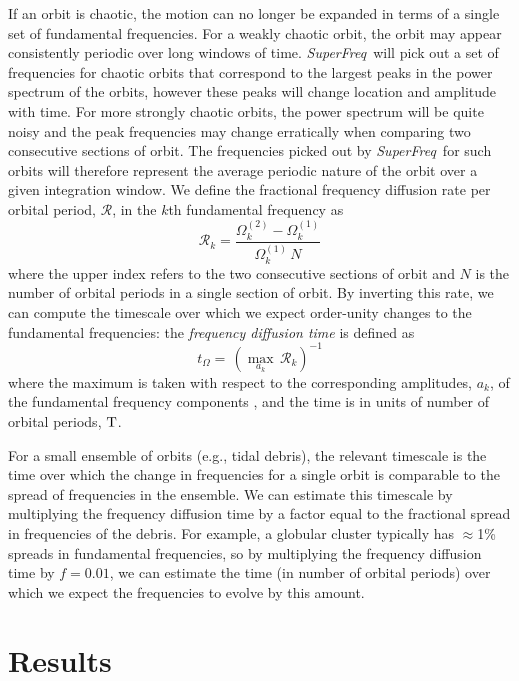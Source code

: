 \documentclass[letterpaper,12pt,preprint]{aastex}
\newcommand{\project}[1]{\textsl{#1}}
\newcommand{\superfreq}{\project{SuperFreq}}
\begin{document}
If an orbit is chaotic, the motion can no longer be expanded in terms of a single set of fundamental frequencies. For a weakly chaotic orbit, the orbit may appear consistently periodic over long windows of time. \superfreq\ will pick out a set of frequencies for chaotic orbits that correspond to the largest peaks in the power spectrum of the orbits, however these peaks will change location and amplitude with time. For more strongly chaotic orbits, the power spectrum will be quite noisy and the peak frequencies may change erratically when comparing two consecutive sections of orbit. The frequencies picked out by \superfreq\ for such orbits will therefore represent the average periodic nature of the orbit over a given integration window. We define the fractional frequency diffusion rate per orbital period, $\mathcal{R}$, in the $k$th fundamental frequency as
\begin{equation}
	\mathcal{R}_k = \frac{\Omega_{k}^{(2)} - \Omega_{k}^{(1)}}{\Omega_{k}^{(1)} \, N} \label{eq:fdrate}
\end{equation}
where the upper index refers to the two consecutive sections of orbit and $N$ is the number of orbital periods in a single section of orbit. By inverting this rate, we can compute the timescale over which we expect order-unity changes to the fundamental frequencies: the \emph{frequency diffusion time} is defined as
\begin{equation}
	t_\Omega = \, (\max_{a_k} \, \mathcal{R}_k)^{-1} \label{eq:fdtime}
\end{equation}
where the maximum is taken with respect to the corresponding amplitudes, $a_k$, of the fundamental frequency components \citep[see][]{valluri12}, and the time is in units of number of orbital periods, ${\rm T}$. 

For a small ensemble of orbits (e.g., tidal debris), the relevant timescale is the time over which the change in frequencies for a single orbit is comparable to the spread of frequencies in the ensemble. We can estimate this timescale by multiplying the frequency diffusion time by a factor equal to the fractional spread in frequencies of the debris. For example, a globular cluster typically has $\approx$1\% spreads in fundamental frequencies, so by multiplying the frequency diffusion time by $f = 0.01$, we can estimate the time (in number of orbital periods) over which we expect the frequencies to evolve by this amount.

%
\section{Results}
\end{document}
